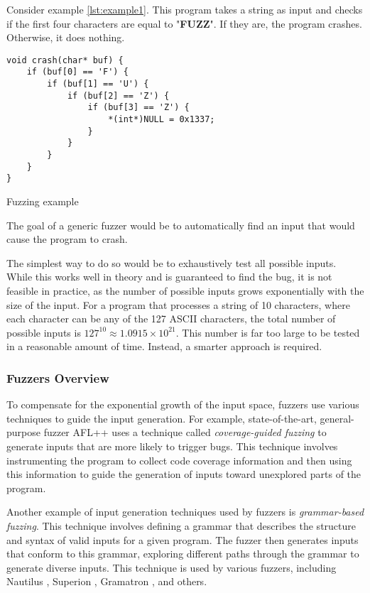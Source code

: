 Consider example \ref{lst:example1}. This program takes a string as input and checks if the first four characters are equal to "\textbf{FUZZ}". If they are, the program crashes. Otherwise, it does nothing.

\begin{listing}[htp]
	\centering
	\begin{minipage}{.6\linewidth}
		\begin{verbatim}
void crash(char* buf) {
	if (buf[0] == 'F') {
		if (buf[1] == 'U') {
			if (buf[2] == 'Z') {
				if (buf[3] == 'Z') {
					*(int*)NULL = 0x1337;
				}
			}
		}
	}
}
		\end{verbatim}
	\end{minipage}
	\caption{Fuzzing example}
	\label{lst:example1}
\end{listing}

The goal of a generic fuzzer would be to automatically find an input that would cause the program to crash.

The simplest way to do so would be to exhaustively test all possible inputs. While this works well in theory and is guaranteed to find the bug, it is not feasible in practice, as the number of possible inputs grows exponentially with the size of the input. For a program that processes a string of 10 characters, where each character can be any of the 127 ASCII characters, the total number of possible inputs is $127^{10} \approx 1.0915 \times 10^{21}$. This number is far too large to be tested in a reasonable amount of time. Instead, a smarter approach is required.

\subsubsection{Fuzzers Overview}

To compensate for the exponential growth of the input space, fuzzers use various techniques to guide the input generation. For example, state-of-the-art, general-purpose fuzzer AFL++ \cite{AFLplusplus-Woot20} uses a technique called \textit{coverage-guided fuzzing} to generate inputs that are more likely to trigger bugs. This technique involves instrumenting the program to collect code coverage information and then using this information to guide the generation of inputs toward unexplored parts of the program.

Another example of input generation techniques used by fuzzers is \textit{grammar-based fuzzing}. This technique involves defining a grammar that describes the structure and syntax of valid inputs for a given program. The fuzzer then generates inputs that conform to this grammar, exploring different paths through the grammar to generate diverse inputs. This technique is used by various fuzzers, including Nautilus \cite{nautilus-grammar-fuzzer}, Superion \cite{superion-grammar-fuzzer}, Gramatron \cite{gramatron-effective-grammar-aware-fuzzing}, and others.

